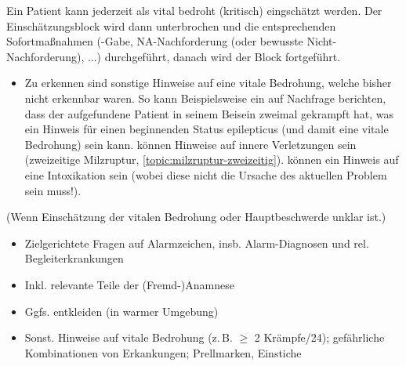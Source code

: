 \documentclass[
ngerman,
paper=a4,
asymmetric,
fontsize=10pt,
headings=small,
draft=false,
numbers=noenddot,
bibtotocnumbered,
footnotes=multiple,
]{scrreprt}
\begin{document}
{{Ein Patient kann jederzeit als vital bedroht (kritisch) eingschätzt
werden. Der Einschätzungsblock wird dann unterbrochen und die
entsprechenden Sofortmaßnahmen (\protect{}-Gabe, NA-Nachforderung (oder bewusste
Nicht-Nachforderung), ...) durchgeführt, danach wird der Block
fortgeführt.}

\begin{itemize}
  \item[\eye] Zu erkennen sind sonstige Hinweise auf
eine vitale Bedrohung, welche bisher nicht erkennbar waren.
So kann Beispielsweise ein  auf Nachfrage
berichten, dass der aufgefundene Patient in seinem Beisein
zweimal gekrampft hat, was ein Hinweis für einen
beginnenden Status epilepticus (und damit eine vitale
Bedrohung) sein kann.  können Hinweise auf
innere Verletzungen sein (zweizeitige Milzruptur,
\ref{topic:milzruptur-zweizeitig}).  können ein
Hinweis auf eine Intoxikation sein (wobei diese nicht die
Ursache des aktuellen Problem sein muss!).
\end{itemize}
}{%
{\tiny (Wenn Einschätzung der vitalen
Bedrohung oder Hauptbeschwerde unklar ist.)}

\begin{itemize}
  \item Zielgerichtete Fragen auf Alarmzeichen, insb.
  Alarm-Diagnosen und rel. Begleiterkrankungen
  \item Inkl. relevante Teile der (Fremd-)Anamnese
  \item Ggfs. entkleiden (in warmer Umgebung)
  \item[\eye] Sonst. Hinweise auf vitale Bedrohung (z.\,B.
  $\geq$ 2 Krämpfe/24\Hour*); gefährliche Kombinationen von
  Erkankungen; Prellmarken, Einstiche
\end{itemize}
}{}{}{}

\end{document}
